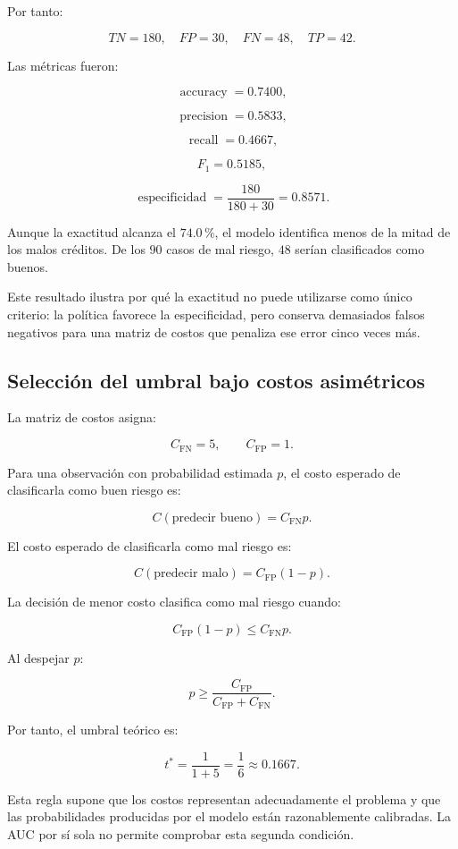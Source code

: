 Por tanto:

\[
TN=180,
\quad
FP=30,
\quad
FN=48,
\quad
TP=42.
\]

Las métricas fueron:

\[
\operatorname{accuracy}
=
0.7400,
\]

\[
\operatorname{precision}
=
0.5833,
\]

\[
\operatorname{recall}
=
0.4667,
\]

\[
F_1
=
0.5185,
\]

\[
\operatorname{especificidad}
=
\frac{180}{180+30}
=
0.8571.
\]

Aunque la exactitud alcanza el \(74.0\,\%\), el modelo identifica menos
de la mitad de los malos créditos. De los \(90\) casos de mal riesgo,
\(48\) serían clasificados como buenos.

Este resultado ilustra por qué la exactitud no puede utilizarse como
único criterio: la política favorece la especificidad, pero conserva
demasiados falsos negativos para una matriz de costos que penaliza ese
error cinco veces más.

\subsection{Selección del umbral bajo costos asimétricos}

La matriz de costos asigna:

\[
C_{\mathrm{FN}}=5,
\qquad
C_{\mathrm{FP}}=1.
\]

Para una observación con probabilidad estimada \(p\), el costo esperado
de clasificarla como buen riesgo es:

\[
C(\text{predecir bueno})
=
C_{\mathrm{FN}}p.
\]

El costo esperado de clasificarla como mal riesgo es:

\[
C(\text{predecir malo})
=
C_{\mathrm{FP}}(1-p).
\]

La decisión de menor costo clasifica como mal riesgo cuando:

\[
C_{\mathrm{FP}}(1-p)
\leq
C_{\mathrm{FN}}p.
\]

Al despejar \(p\):

\[
p
\geq
\frac{
    C_{\mathrm{FP}}
}{
    C_{\mathrm{FP}}+C_{\mathrm{FN}}
}.
\]

Por tanto, el umbral teórico es:

\[
t^{*}
=
\frac{1}{1+5}
=
\frac{1}{6}
\approx
0.1667.
\]

Esta regla supone que los costos representan adecuadamente el problema y
que las probabilidades producidas por el modelo están razonablemente
calibradas. La AUC por sí sola no permite comprobar esta segunda
condición.

